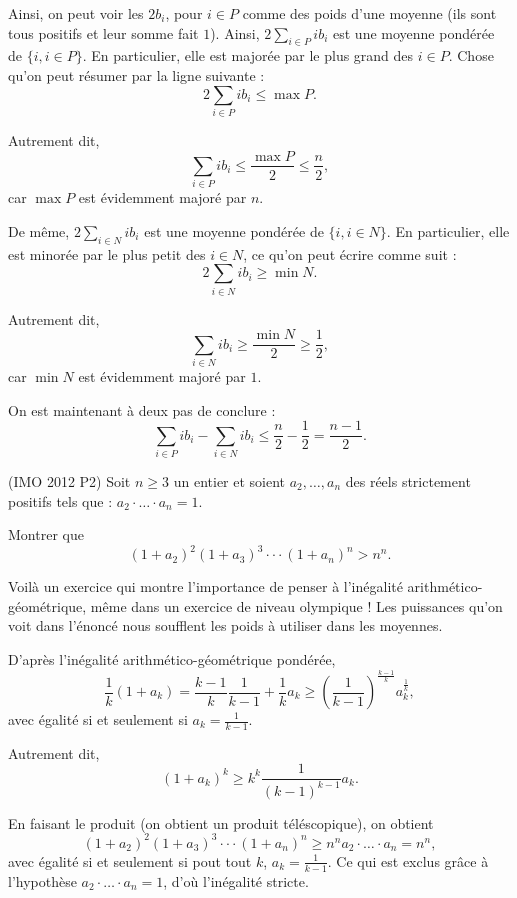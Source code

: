 \begin{sol}
Ainsi, on peut voir les $2b_i$, pour $i \in P$ comme des poids d'une moyenne (ils sont tous positifs et leur somme fait $1$). Ainsi, $2\sum_{i \in P} ib_i$ est une moyenne pondérée de $\{i,i \in P\}$. En particulier, elle est majorée par le plus grand des $i \in P$. Chose qu'on peut résumer par la ligne suivante :
\[
2\sum_{i \in P} ib_i \leq \max P.
\]

Autrement dit,
\[
\sum_{i \in P} ib_i \leq \frac{\max P}2 \leq \frac{n}2,
\]
car $\max P$ est évidemment majoré par $n$.

De même, $2 \sum_{i \in N} ib_i$ est une moyenne pondérée de $\{i,i \in N\}$. En particulier, elle est minorée par le plus petit des $i \in N$, ce qu'on peut écrire comme suit :
\[
2\sum_{i \in N} ib_i \geq \min N.
\]

Autrement dit,
\[
\sum_{i \in N} ib_i \geq \frac{\min N}2 \geq \frac12,
\]
car $\min N$ est évidemment majoré par $1$.

On est maintenant à deux pas de conclure :
\[
\sum_{i \in P} ib_i - \sum_{i \in N} ib_i \leq \frac{n}2 - \frac12 = \frac{n-1}2.
\]
\end{sol}

\begin{exo}
(IMO 2012 P2)
Soit $n \geq 3$ un entier et soient $a_2,\dots,a_n$ des réels strictement positifs tels que : $a_2 \cdot \dots \cdot a_n =1$.

Montrer que
\[
(1+a_2)^2(1+a_3)^3 \cdot \cdot \cdot (1+a_n)^n > n^n.
\]
\end{exo}

\begin{sol}
Voilà un exercice qui montre l'importance de penser à l'inégalité arithmético-géométrique, même dans un exercice de niveau olympique ! Les puissances qu'on voit dans l'énoncé nous soufflent les poids à utiliser dans les moyennes.

D'après l'inégalité arithmético-géométrique pondérée,
\[
\frac1{k}(1+a_k) = \frac{k-1}{k} \frac1{k-1} + \frac1{k} a_k \geq \left(\frac1{k-1}\right)^{\frac{k-1}{k}}a_k^{\frac1{k}},
\]
avec égalité si et seulement si $a_k = \frac1{k-1}$.

Autrement dit,
\[
(1+a_k)^k \geq k^k \frac1{(k-1)^{k-1}} a_k.
\]

En faisant le produit (on obtient un produit téléscopique), on obtient
\[
(1+a_2)^2(1+a_3)^3 \cdot \cdot \cdot (1+a_n)^n \geq n^n a_2 \cdot \dots \cdot a_n = n^n,
\]
avec égalité si et seulement si pout tout $k$, $a_k = \frac1{k-1}$. Ce qui est exclus grâce à l'hypothèse $a_2 \cdot \dots \cdot a_n =1$, d'où l'inégalité stricte.
\end{sol}


